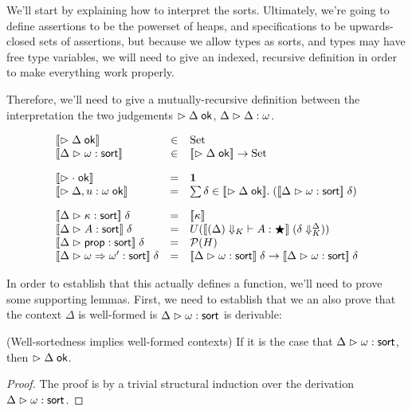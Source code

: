We'll start by explaining how to interpret the sorts. Ultimately,
we're going to define assertions to be the powerset of heaps, and
specifications to be upwards-closed sets of assertions, but because we
allow types as sorts, and types may have free type variables, we will
need to give an indexed, recursive definition in order to make
everything work properly.

Therefore, we'll need to give a mutually-recursive definition between
the interpretation the two judgements $\vartriangleright {\Delta} \;\mathsf{ok}$,
${\Delta} \vartriangleright {\Delta} : {\omega}$.

\begin{displaymath}
  \begin{array}{lcl}
    \interp{\judgeACtx{\Delta}} & \in & \mbox{Set} \\
    \interp{\judgeSort{\omega}} & \in & \interp{\judgeACtx{\Delta}} \to \mbox{Set} \\[1em]

    \interp{\judgeACtx{\cdot}} & = & \unittype \\
    \interp{\judgeACtx{\Delta, u:\omega}} & = & \sum \delta \in \interp{\judgeACtx{\Delta}}.\; 
                                                  (\interp{\judgeSort{\omega}}\;\delta) \\[1em]
 
    \interp{\judgeSort{\kappa}}\;\delta & = & \interp{\kappa} \\
    \interp{\judgeSort{A}}\;\delta & = & 
       U(\interp{\judgeWK[\restrictkind{\Delta}]{A}{\bigstar}}\;(\restricttyenv{\Delta}{\delta})) \\
    \interp{\judgeSort{\assert}}\;\delta & = & \powerset{H} \\
    \interp{\judgeSort{\omega \To \omega'}}\;\delta & = &  
       \interp{\judgeSort{\omega}}\;\delta \to \interp{\judgeSort{\omega}}\;\delta \\
  \end{array}
\end{displaymath}

In order to establish that this actually defines a function, we'll
need to prove some supporting lemmas. First, we need to establish that
we an also prove that the context $\Delta$ is well-formed is
${{\Delta}} \vartriangleright {{\omega}} : {\mathsf{sort}}$ is derivable:

\begin{lemma}{(Well-sortedness implies well-formed contexts)}
If it is the case that ${{\Delta}} \vartriangleright {{\omega}} : {\mathsf{sort}}$, then $\vartriangleright {\Delta} \;\mathsf{ok}$.
\end{lemma}
\begin{proof}
The proof is by a trivial structural induction over the derivation ${{\Delta}} \vartriangleright {{\omega}} : {\mathsf{sort}}$. 
\end{proof}

